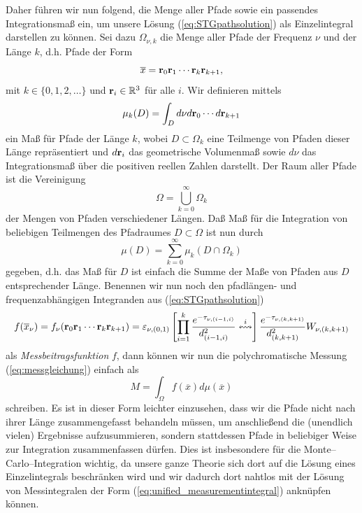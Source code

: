 	Daher führen wir nun \citet[][8.2]{Veach:1997p9136} folgend, die Menge aller Pfade sowie ein passendes Integrationsmaß ein, um unsere Lösung (\ref{eq:STGpathsolution}) als Einzelintegral darstellen zu können. Sei dazu $\Omega_{\nu,k}$ die Menge aller Pfade der Frequenz $\nu$ und der Länge $k$, d.h. Pfade der Form
	$${\overline x}=\mathbf{r}_0\mathbf{r}_1\cdots\mathbf{r}_k\mathbf{r}_{k+1},$$
	mit $k\in\{0,1,2,\dots\}$ und $\mathbf{r}_i \in \mathbb{R}^3$ für alle $i$. Wir definieren mittels
	$$\mu_k(D)=\int_D d\nu d\mathbf{r}_0\cdots d\mathbf{r}_{k+1}$$
	ein Maß für Pfade der Länge $k$, wobei $D\subset\Omega_k$ eine Teilmenge von Pfaden dieser Länge repräsentiert und $d\mathbf{r}_i$ das geometrische Volumenmaß sowie $d\nu$ das Integrationsmaß über die positiven reellen Zahlen darstellt. Der Raum aller Pfade ist die Vereinigung
	$$\Omega=\bigcup_{k=0}^\infty \Omega_k$$
	der Mengen von Pfaden verschiedener Längen. Daß Maß für die Integration von beliebigen Teilmengen des Pfadraumes $D\subset\Omega$ ist nun durch
	$$\mu(D)=\sum_{k=0}^\infty \mu_k(D\cap\Omega_k)$$
	gegeben, d.h. das Maß für $D$ ist einfach die Summe der Maße von Pfaden aus $D$ entsprechender Länge. Benennen wir nun noch den pfadlängen- und frequenzabhängigen Integranden aus (\ref{eq:STGpathsolution})
	\begin{equation}
		f({\overline x}_\nu)=f_\nu(\mathbf{r}_0\mathbf{r}_1\cdots\mathbf{r}_k\mathbf{r}_{k+1})=\varepsilon_{\nu,(0,1)}\left[\prod_{i=1}^k\frac{e^{-\tau_{\nu,(i-1,i)}}}{d_{(i-1,i)}^2}\overset{i}{\leftrightsquigarrow}\right]\frac{e^{-\tau_{\nu,(k,k+1)}}}{d_{(k,k+1)}^2} W_{\nu,(k,k+1)}
		\label{eq:mcf}
	\end{equation}
	als {\em Messbeitragsfunktion} $f$, dann können wir nun die polychromatische Messung (\ref{eq:messgleichung}) einfach als
	\begin{equation}
		M=\int_\Omega f({\overline x})d\mu({\overline x})
		\label{eq:unified_measurementintegral}
	\end{equation}
	schreiben. Es ist in dieser Form leichter einzusehen, dass wir die Pfade nicht nach ihrer Länge zusammengefasst behandeln müssen, um anschließend die (unendlich vielen) Ergebnisse aufzusummieren, sondern stattdessen Pfade in beliebiger Weise zur Integration zusammenfassen dürfen. Dies ist insbesondere für die Monte--Carlo--Integration wichtig, da unsere ganze Theorie sich dort auf die Lösung eines Einzelintegrals beschränken wird und wir dadurch dort nahtlos mit der Lösung von Messintegralen der Form (\ref{eq:unified_measurementintegral}) anknüpfen können.
